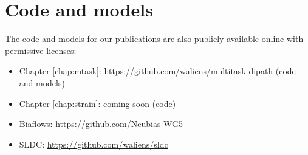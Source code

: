 \section{Code and models}

The code and models for our publications are also publicly available online with permissive licenses:
\begin{itemize}
  \item Chapter \ref{chap:mtask}: \url{https://github.com/waliens/multitask-dipath} (code and models)
  \item Chapter \ref{chap:strain}: coming soon (code) %
  \item Biaflows: \url{https://github.com/Neubias-WG5}
  \item SLDC: \url{https://github.com/waliens/sldc}
\end{itemize}

